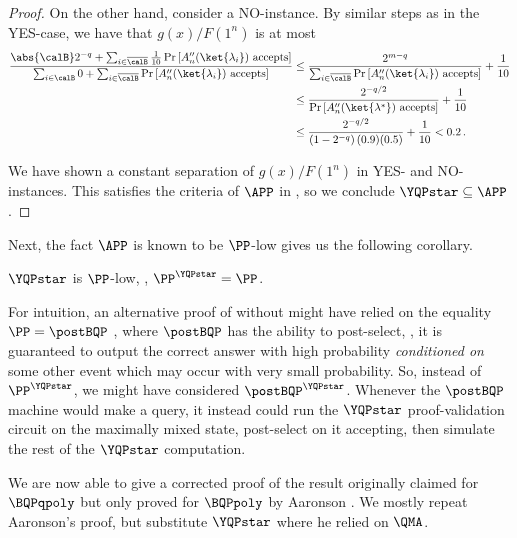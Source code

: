 \documentclass{toc}
\begin{document}
\begin{proof}
	On the other hand, consider a NO-instance.
	By similar steps as in the YES-case,
	we have that $g(x)/F(1^n)$ is at most
	\begin{align*}
		\frac{
			\abs{\calB} 2^{-q} + \sum_{i\in\overline{\calB}}
			\frac{1}{10} \Pr\left[A''_n(\ket{\lambda_i})\text{ accepts}\right]
		}
		{
			\sum_{i\in \calB} 0 + \sum_{i\in \overline{\calB}} \Pr\left[A''_n(\ket{\lambda_i})\text{ accepts}\right]
		}
		&\leq
		\frac{2^{m-q}}
		{\sum_{i\in \overline{\calB}} \Pr\left[A''_n(\ket{\lambda_i})
			\text{ accepts}\right]
		}
		+
		\frac{1}{10} \\
		&\leq
		\frac{2^{-q/2}}{\Pr\left[A''_n(\ket{\lambda^*})\text{ accepts}\right]} + \frac{1}{10}	\\
		&
		\leq \frac{2^{-q/2} }{\left(1-2^{-q}\right) (0.9) (0.5)} + \frac{1}{10}
		< 0.2	\, .
	\end{align*}
	
	We have shown a constant separation of $g(x)/F(1^n)$ in YES- and NO-instances.
	This satisfies the criteria of $\APP$ in ,
	so we conclude $\YQPstar\subseteq \APP$.
\end{proof}

Next, the fact $\APP$ is known to be $\PP$-low \cite[Theorem 6.4.14]{li1993counting}
gives us the following corollary.

\begin{corollary}\label{corr:YQPisLow}
	$\YQPstar$ is $\PP$-low, \ie{}, $\PP^{\YQPstar}=\PP$.
\end{corollary}

For intuition, an alternative proof of  without  
might have relied
on the equality $\PP=\postBQP$ \cite{aaronson2005quantum},
where $\postBQP$ has the ability to post-select, \ie{}, it is guaranteed to output
the correct answer with high probability \emph{conditioned on} some other event
which may occur with very small probability.
So, instead of $\PP^\YQPstar$, we might have considered $\postBQP^\YQPstar$.
Whenever the $\postBQP$ machine would make a query, it instead could
run the $\YQPstar$ proof-validation circuit on
the maximally mixed state, post-select on it accepting,
then simulate the rest of the $\YQPstar$ computation.

We are now able to give a corrected proof of the result originally claimed for
$\BQPqpoly$ but only proved for $\BQPpoly$ by Aaronson \cite{aaronson_subtle}.
We mostly repeat Aaronson's proof, but substitute $\YQPstar$ where he relied on $\QMA$.
\end{document}
